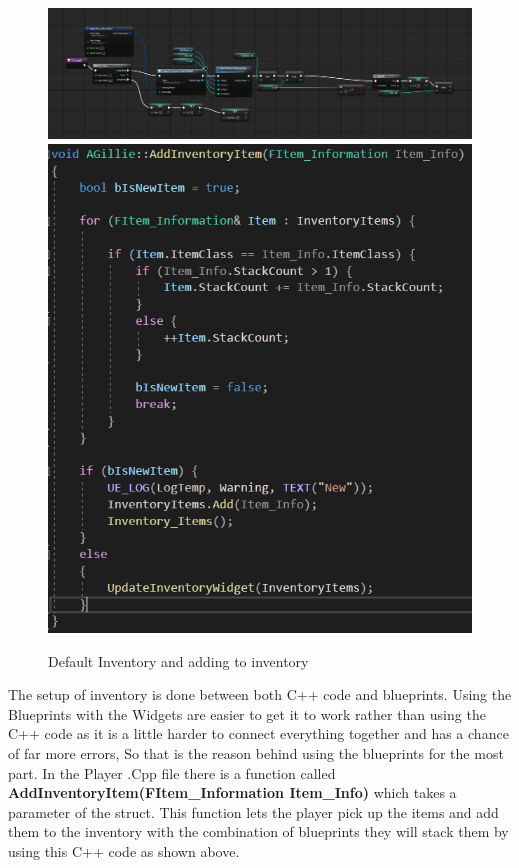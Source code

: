 \begin{figure}[H]
    \centering
    \includegraphics[scale=.3]{img/InventoryDefault.PNG}
    \includegraphics[scale=.3]{img/AddInventItem.PNG}
    \caption{Default Inventory and adding to inventory}
    \label{Default Inventory}
\end{figure}
The setup of inventory is done between both C++ code and blueprints. Using the Blueprints with the Widgets are easier to get it to work rather than using the C++ code as it is a little harder to connect everything together and has a chance of far more errors, So that is the reason behind using the blueprints for the most part. In the Player .Cpp file there is a function called \textbf{AddInventoryItem(FItem\_Information Item\_Info)} which takes a parameter of the struct. This function lets the player pick up the items and add them to the inventory with the combination of blueprints they will stack them by using this C++ code as shown above.
